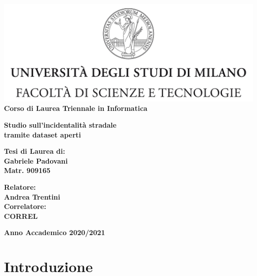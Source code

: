 \documentclass[a4paper]{report}
\begin{document}
\begin{titlepage}
\begin{center}
\includegraphics[width=\textwidth]{Logo.jpg}\\
{\large{\bf Corso di Laurea Triennale in Informatica}}
\end{center}
\vspace{12mm}
\begin{center}
{\huge{\bf Studio sull'incidentalità stradale}}\\
\vspace{4mm}
{\huge{\bf tramite dataset aperti}}\\
\end{center}
\vspace{12mm}
\begin{flushright}
{\large{\bf Tesi di Laurea di:}}\\
{\large{\bf Gabriele Padovani}}\\
{\large{\bf Matr. 909165}}\\
\end{flushright}
\vspace{4mm}
\begin{flushleft}
{\large{\bf Relatore:}}\\
{\large{\bf Andrea Trentini}}\\
\vspace{4mm}
{\large{\bf Correlatore:}}\\
{\large{\bf CORREL}}\\
\end{flushleft}
\vspace{12mm}
\begin{center}
{\large{\bf Anno Accademico 2020/2021}}
\end{center}
\end{titlepage}


\tableofcontents

\listoftodos

\chapter{Introduzione}
\end{document}
